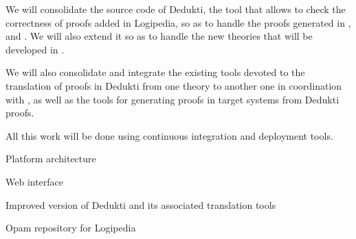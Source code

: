 \begin{workpackage}[id=access,type=RTD,wphases=1-48,
  short=Access,%
  title={Access},
  activity=tna,
  lead=Inr,InrRM=54,OcaRM=6]
\begin{tasklist}
  \begin{task}[id=dedukti,
      title=Development and maintenance of Dedukti tools,
      shorttitle=Dev.,
      lead=Inr,InrRM=18,wphases=19-36] We will consolidate the source
    code of Dedukti, the tool that allows to check the correctness of
    proofs added in Logipedia, so as to handle the proofs generated in
    ,  and . We
    will also extend it so as to handle the new theories that will be
    developed in .

    We will also consolidate and integrate the existing tools devoted
    to the translation of proofs in Dedukti from one theory to another
    one in coordination with , as well as the tools
    for generating proofs in target systems from Dedukti proofs.
    
    All this work will be done using continuous integration and
    deployment tools.
  \end{task}
  
\end{tasklist}


\begin{wpdelivs}

  
  \begin{wpdeliv}[due=6,id=archi,dissem=PU,nature=OTHER,lead=Inr,task=archi]{Platform architecture}\end{wpdeliv}

  \begin{wpdeliv}[due=18,id=web,dissem=PU,nature=DEC,lead=Inr,task=web]{Web interface}\end{wpdeliv}

  \begin{wpdeliv}[due=24,id=dedukti,dissem=PU,nature=OTHER,lead=Inr,task=dedukti]{Improved version of Dedukti and its associated translation tools}\end{wpdeliv}

  
  \begin{wpdeliv}[due=12,id=opam,dissem=PU,nature=OTHER,lead=Oca,task=opam,miles=opam]{Opam repository for Logipedia}\end{wpdeliv}


\end{wpdelivs}
\end{workpackage}
